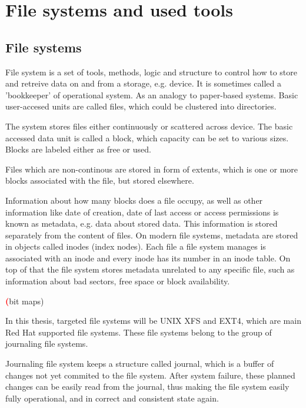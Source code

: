 \documentclass[
  color, %
  table, %
  lof,   %
  lot,   %
]{fithesis3}
\newcommand{\todo}[1]{\textcolor{red}{\textbf{#1}}}
\begin{document}
\chapter{File systems and used tools}
\section{File systems}
File system is a set of tools, methods, logic and structure to control how to store and retreive data on and from a storage, e.g. device. It is sometimes called a 'bookkeeper' of operational system. As an  analogy to paper-based systems. Basic user-accesed units are called files, which could be clustered into directories.

The system stores files either continuously or scattered across device. The basic accessed data unit is called a block, which capacity can be set to various sizes. Blocks are labeled either as free or used.

Files which are non-continous are stored in form of extents, which is one or more blocks associated with the file, but stored elsewhere.  

Information about how many blocks does a file occupy, as well as other information like date of creation, date of last access or access permissions is known as metadata, e.g. data about stored data. This information is stored separately from the content of files. On modern file systems, metadata are stored in objects called inodes (index nodes). Each file a file system manages is associated with an inode and every inode has its number in an inode table. On top of that the file system stores metadata unrelated to any specific file, such as information about bad sectors, free space or block availability.


\todo(bit maps)

In this thesis, targeted file systems will be UNIX XFS and EXT4, which are main Red Hat supported file systems. These file systems belong to the group of journaling file systems.

Journaling file system keeps a structure called journal, which is a buffer of changes not yet commited to the file system. After system failure, these planned changes can be easily read from the journal, thus making the file system easily fully operational, and in correct and consistent state again.
\end{document}
